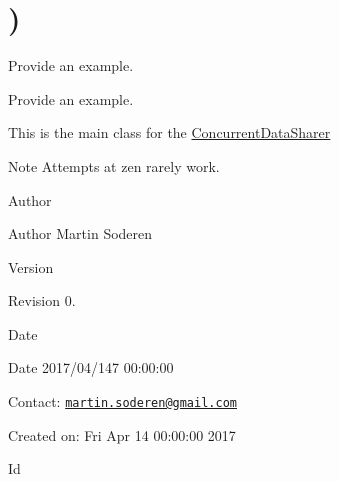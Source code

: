 \hypertarget{group__somewhere}{}\section{)}
\label{group__somewhere}


Provide an example.  


Provide an example. 

This is the main class for the \hyperlink{classConcurrentDataSharer}{Concurrent\+Data\+Sharer}

\begin{DoxyNote}{Note}
Attempts at zen rarely work.
\end{DoxyNote}
\begin{DoxyAuthor}{Author}

\end{DoxyAuthor}
\begin{DoxyParagraph}{Author}
Martin Soderen
\end{DoxyParagraph}


\begin{DoxyVersion}{Version}

\end{DoxyVersion}
\begin{DoxyParagraph}{Revision}
0. 
\end{DoxyParagraph}


\begin{DoxyDate}{Date}

\end{DoxyDate}
\begin{DoxyParagraph}{Date}
2017/04/147 00\+:00\+:00 
\end{DoxyParagraph}


Contact\+: \href{mailto:martin.soderen@gmail.com}{\tt martin.\+soderen@gmail.\+com}

Created on\+: Fri Apr 14 00\+:00\+:00 2017

\begin{DoxyParagraph}{Id}

\end{DoxyParagraph}
